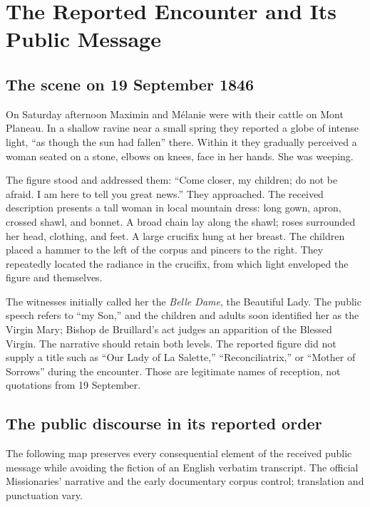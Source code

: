 \section{The Reported Encounter and Its Public Message}

\subsection{The scene on 19 September 1846}

On Saturday afternoon Maximin and Mélanie were with their cattle on Mont Planeau. In a shallow ravine near a small spring they reported a globe of intense light, ``as though the sun had fallen'' there. Within it they gradually perceived a woman seated on a stone, elbows on knees, face in her hands. She was weeping.

The figure stood and addressed them: ``Come closer, my children; do not be afraid. I am here to tell you great news.'' They approached. The received description presents a tall woman in local mountain dress: long gown, apron, crossed shawl, and bonnet. A broad chain lay along the shawl; roses surrounded her head, clothing, and feet. A large crucifix hung at her breast. The children placed a hammer to the left of the corpus and pincers to the right. They repeatedly located the radiance in the crucifix, from which light enveloped the figure and themselves.

The witnesses initially called her the \emph{Belle Dame}, the Beautiful Lady. The public speech refers to ``my Son,'' and the children and adults soon identified her as the Virgin Mary; Bishop de Bruillard's act judges an apparition of the Blessed Virgin. The narrative should retain both levels. The reported figure did not supply a title such as ``Our Lady of La Salette,'' ``Reconciliatrix,'' or ``Mother of Sorrows'' during the encounter. Those are legitimate names of reception, not quotations from 19 September.

\subsection{The public discourse in its reported order}

The following map preserves every consequential element of the received public message while avoiding the fiction of an English verbatim transcript. The official Missionaries' narrative and the early documentary corpus control; translation and punctuation vary.

